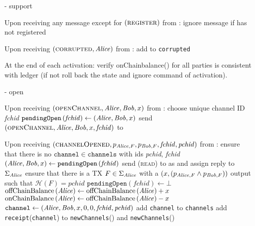\begin{systembox}{\fpaynet - support}
\begin{algorithmic}[1]
    \State Upon receiving any message except for
    $\left(\textsc{register}\right)$ from \alice:
    \Indent
      \State ignore message if \alice{} has not registered
    \EndIndent
    \State

    \State Upon receiving $\left(\textsc{corrupted}, \mathit{Alice}\right)$ from
    \simulator:
    \Indent
      \State add \alice{} to \texttt{corrupted}
    \EndIndent
    \State

    \State At the end of each activation: 
    \Indent
      \State verify onChainbalance() for all parties is consistent with ledger (if not roll back the state and ignore command of activation).
    \EndIndent
  \end{algorithmic}
\end{systembox}

\begin{systembox}{\fpaynet - open}
  \label{alg:fpaynet:open}
  \begin{algorithmic}[1]
    \State Upon receiving $\left(\textsc{openChannel}, \mathit{Alice}, \mathit{Bob}, x\right)$
    from \alice:
    \Indent
      \State choose unique channel ID \textit{fchid}
      \State $\mathtt{pendingOpen}\left(\mathit{fchid}\right) \gets
      \left(\mathit{Alice}, \mathit{Bob}, x\right)$
      \State send $\left(\textsc{openChannel}, \mathit{Alice}, \mathit{Bob}, x,
      \mathit{fchid}\right)$ to \simulator
    \EndIndent
    \State

    \State Upon receiving $\left(\textsc{channelOpened}, p_{\mathit{Alice}, F}, p_{\mathit{Bob},
    F}, \mathit{fchid}, \mathit{pchid}\right)$ from \simulator:
    \Indent
      \State ensure that there is no $\mathtt{channel} \in \mathtt{channels}$
      with ids \textit{pchid}, \textit{fchid}
      \State $\left(\mathit{Alice}, \mathit{Bob}, x\right) \gets
      \mathtt{pendingOpen}\left(\mathit{fchid}\right)$
      \State send (\textsc{read}) to \ledger{} as \alice{} and assign reply to
      $\Sigma_{\mathit{Alice}}$
      \State ensure that there is a TX $F \in \Sigma_{\mathit{Alice}}$ with a $\left(x,
      \left(p_{\mathit{Alice}, F} \wedge p_{\mathit{Bob}, F}\right)\right)$ output such that
      $\mathcal{H}\left(F\right) = \mathit{pchid}$
      \State $\mathtt{pendingOpen}\left(\mathit{fchid}\right) \gets \bot$
      \State $\mathrm{offChainBalance}\left(\mathit{Alice}\right) \gets
      \mathrm{offChainBalance}\left(\mathit{Alice}\right) + x$ 
      \State $\mathrm{onChainBalance}\left(\mathit{Alice}\right) \gets
      \mathrm{offChainBalance}\left(\mathit{Alice}\right) - x$
      \State $\mathtt{channel} \gets \left(\mathit{Alice}, \mathit{Bob}, x, 0, 0,
      \mathit{fchid}, \mathit{pchid}\right)$
      \State add \texttt{channel} to \texttt{channels}
      \State add \texttt{receipt}(\texttt{channel}) to
      \texttt{newChannels}(\alice) and \texttt{newChannels}(\bob)
    \EndIndent
    \State
  \end{algorithmic}
\end{systembox}

